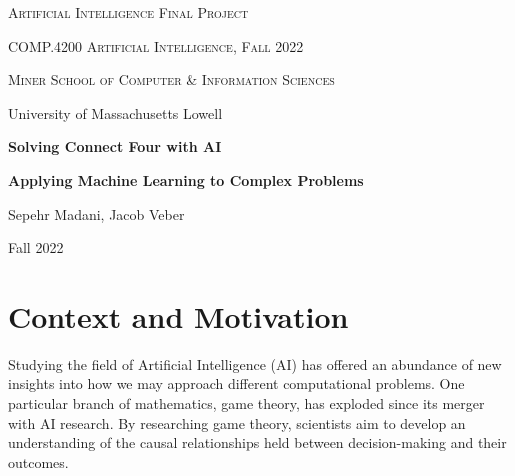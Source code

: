 \documentclass[12pt]{article}
\newcommand{\name}{\textsc{Connect Four}}
\begin{document}
\begin{titlepage}
	\centering
        {\scshape\Large Artificial Intelligence Final Project\par}
        \vspace{0.5cm}
        {\scshape\small COMP.4200 Artificial Intelligence, Fall 2022 \par}
        \vspace{0.5cm}
	{\scshape Miner School of Computer \& Information Sciences\par
        University of Massachusetts Lowell\par}

	\vspace{1.5cm}
	{\huge\bfseries Solving Connect Four with AI\par}
	\vspace{0.5cm}
	{\large\bfseries Applying Machine Learning to Complex Problems\par}
	\vspace{1.5cm}
	{\Large Sepehr Madani, Jacob Veber\par}
	\vfill
	{\large Fall 2022\par} %
\end{titlepage}

\begin{abstract}
Examining the application of artificial intelligence techniques used to solve \name\ gives us an insightful and practical study of the AI theories in a real-world application. In this paper, we observe and examine the advantages that different optimization algorithms offer, namely, \texttt{MinMax} and \texttt{Alpha-Beta} pruning, which furthers our understanding of how we may apply AI to other fields of research.\par
There are also strategies specific to ensuring a victory in \name\ that reveal how a problem can be broken apart and digested, giving a foundation to build a solution from.\par
\vfill
\noindent\textbf{Keywords:} machine learning; game theory; artificial intelligence, alpha-beta pruning

\end{abstract}


\section{Context and Motivation}
Studying the field of Artificial Intelligence (AI) has offered an abundance of new insights into how we may approach different computational problems.  One particular branch of mathematics, game theory, has exploded since its merger with AI research.  By researching game theory, scientists aim to develop an understanding of the causal relationships held between decision-making and their outcomes.  
\end{document}
